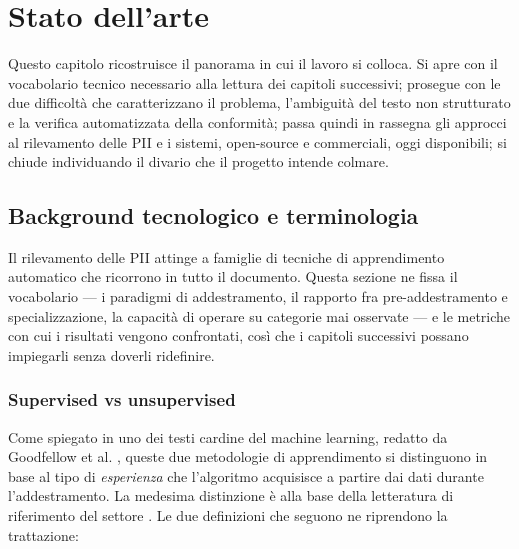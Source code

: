 \chapter{Stato dell'arte}
\label{cap:stato-arte}

Questo capitolo ricostruisce il panorama in cui il lavoro si colloca. Si apre con il vocabolario tecnico necessario alla lettura dei capitoli successivi; prosegue con le due difficoltà che caratterizzano il problema, l'ambiguità del testo non strutturato e la verifica automatizzata della conformità; passa quindi in rassegna gli approcci al rilevamento delle PII e i sistemi, open-source e commerciali, oggi disponibili; si chiude individuando il divario che il progetto intende colmare.

\section{Background tecnologico e terminologia} %
\label{sec:background-tecnologico}
Il rilevamento delle PII attinge a famiglie di tecniche di apprendimento automatico che ricorrono in tutto il documento. Questa sezione ne fissa il vocabolario --- i paradigmi di addestramento, il rapporto fra pre-addestramento e specializzazione, la capacità di operare su categorie mai osservate --- e le metriche con cui i risultati vengono confrontati, così che i capitoli successivi possano impiegarli senza doverli ridefinire.

\subsection{Supervised vs unsupervised}
\label{sub:supervised-unsupervised}
Come spiegato in uno dei testi cardine del machine learning, redatto da Goodfellow et al. \cite[§~5.1]{DeeplearningbookorgContentsMlhtml}, queste due metodologie di apprendimento si distinguono in base al tipo di \textit{esperienza} che l'algoritmo acquisisce a partire dai dati durante l'addestramento. La medesima distinzione è alla base della letteratura di riferimento del settore \cite{bishopPatternRecognitionMachine2006, hastieElementsStatisticalLearning2017}. Le due definizioni che seguono ne riprendono la trattazione:

